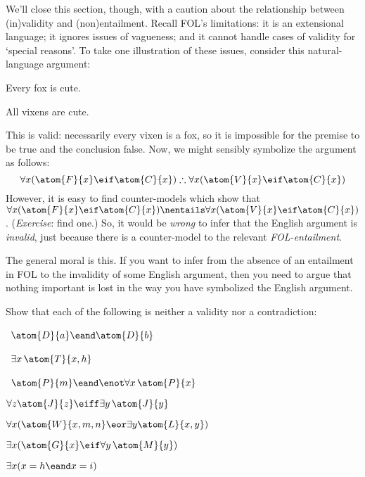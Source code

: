 We'll close this section, though, with a caution about the relationship between (in)validity and (non)entailment. Recall FOL's limitations: it is an extensional language; it ignores issues of vagueness; and it cannot handle cases of validity for `special reasons'. To take one illustration of these issues, consider this natural-language argument: 
\begin{earg}
	\item[] Every fox is cute.
	\item[\therefore] All vixens are cute.
\end{earg}
This is valid: necessarily every vixen is a fox, so it is impossible for the premise to be true and the conclusion false. Now, we might sensibly symbolize the argument as follows:
$$\forall x(\atom{F}{x} \eif \atom{C}{x}) \therefore \forall x(\atom{V}{x} \eif  \atom{C}{x})$$
However, it is easy to find counter-models which show that $\forall x(\atom{F}{x} \eif \atom{C}{x}) \nentails \forall x(\atom{V}{x} \eif  \atom{C}{x})$. (\emph{Exercise}: find one.) So, it would be \emph{wrong} to infer that the English argument is \emph{invalid}, just because there is a counter-model to the relevant \emph{FOL{}-entailment}.

The general moral is this. If you want to infer from the absence of an entailment in FOL to the invalidity of some English argument, then you need to argue that nothing important is lost in the way you have symbolized the English argument.

\practiceproblems

\solutions
\problempart
\label{pr.Contingent}
Show that each of the following is neither a validity nor a contradiction:
\begin{earg}
\item \leftsolutions\ $\atom{D}{a}  \eand \atom{D}{b}$
\item \leftsolutions\ $\exists x\, \atom{T}{x,h}$
\item \leftsolutions\ $\atom{P}{m}  \eand \enot\forall x\, \atom{P}{x}$
\item $\forall z \atom{J}{z} \eiff \exists y\, \atom{J}{y}$
\item $\forall x (\atom{W}{x,m,n} \eor \exists y\atom{L}{x,y})$
\item $\exists x (\atom{G}{x} \eif \forall y\, \atom{M}{y})$
\item $\exists x (x = h \eand x = i)$
\end{earg}

